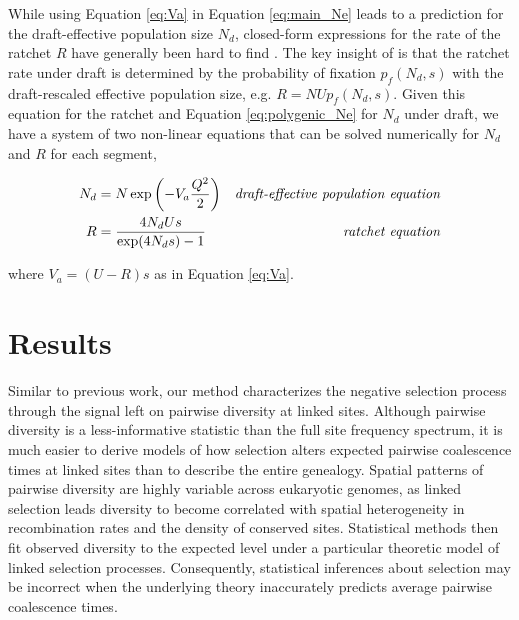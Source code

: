 \documentclass[11pt]{article}
\begin{document}
While using Equation \eqref{eq:Va} in Equation \eqref{eq:main_Ne} leads to a
prediction for the draft-effective population size $N_d$, closed-form
expressions for the rate of the ratchet $R$ have generally been hard to find
\parencite{Haigh1978-gt,Higgs1995-xc,Gessler1995-hz}. The key insight of
\textcite{Santiago2016-mu} is that the ratchet rate under draft is determined
by the probability of fixation $p_f(N_d, s)$
\parencite{Kimura1962-su,Malecot1948-zv} with the draft-rescaled effective
population size, e.g. $R = N U p_f(N_d, s)$. Given this equation for the
ratchet and Equation \eqref{eq:polygenic_Ne} for $N_d$ under draft, we have a
system of two non-linear equations that can be solved numerically for $N_d$ and
$R$ for each segment,

\begin{align}
  \label{eq:main_eqns}
  N_d &= N \exp \left( -V_a \frac{Q^2}{2} \right) & \text{\emph{draft-effective population equation}} \\
  R &= \frac{4N_d U s}{\exp(4 N_d s)-1}  & \text{\emph{ratchet equation}}
\end{align}

where $V_a = (U-R)s$ as in Equation \eqref{eq:Va}.





\section*{Results}

Similar to previous work, our method characterizes the negative selection
process through the signal left on pairwise diversity at linked sites. Although
pairwise diversity is a less-informative statistic than the full site frequency
spectrum, it is much easier to derive models of how selection alters expected
pairwise coalescence times at linked sites than to describe the entire
genealogy. Spatial patterns of pairwise diversity are highly variable across
eukaryotic genomes, as linked selection leads diversity to become correlated
with spatial heterogeneity in recombination rates and the density of conserved
sites. Statistical methods then fit observed diversity to the expected level
under a particular theoretic model of linked selection processes. Consequently,
statistical inferences about selection may be incorrect when the underlying
theory inaccurately predicts average pairwise coalescence times.
\end{document}
